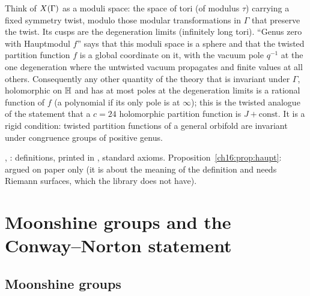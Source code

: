 \begin{physics}
Think of $X(\Gamma)$ as a moduli space: the space of tori (of modulus $\tau$) carrying a fixed symmetry twist,
modulo those modular transformations in $\Gamma$ that preserve the twist.  Its cusps are the degeneration limits
(infinitely long tori).  ``Genus zero with Hauptmodul $f$'' says that this moduli space is a sphere and that the
twisted partition function $f$ is a global coordinate on it, with the vacuum pole $q^{-1}$ at the one degeneration
where the untwisted vacuum propagates and finite values at all others.  Consequently any other quantity of the theory
that is invariant under $\Gamma$, holomorphic on $\mathbb{H}$ and has at most poles at the degeneration limits is a
rational function of $f$ (a polynomial if its only pole is at $\infty$); this is the twisted analogue of the
statement that a $c=24$ holomorphic partition function is $J+\text{const}$.  It is a rigid condition: twisted
partition functions of a general orbifold are invariant under congruence groups of positive genus.
\end{physics}
\begin{status}
, : definitions, printed in
, standard axioms.  Proposition~\ref{ch16:prop:haupt}: argued on paper
only (it is about the meaning of the definition and needs Riemann surfaces, which the library does not have).
\end{status}

\section{Moonshine groups and the Conway--Norton statement}\label{ch16:sec:statement}

\subsection{Moonshine groups}

